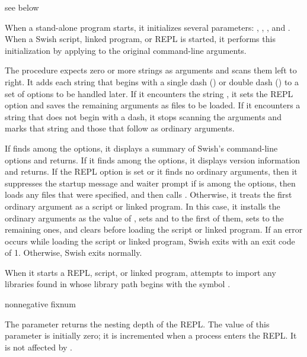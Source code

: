 \begin{procedure}
\end{procedure}
\returns{} see below

When a stand-alone program starts, it initializes several parameters:
, , , and
.
When a Swish script, linked program, or REPL is started, it performs this
initialization by applying  to the original command-line
arguments.

The  procedure expects zero or more strings as arguments
and scans them left to right.
It adds each string that begins with a single dash (\sopt{}) or double dash
(\lopt{}) to a set of options to be handled later.
If it encounters the string \str{\lopt{}}, it sets the REPL option and
saves the remaining arguments as files to be loaded.
If it encounters a string that does not begin with a dash, it stops scanning
the arguments and marks that string and those that follow as ordinary
arguments.

If  finds  among the options,
it displays a summary of Swish's command-line options and returns.
If it finds  among the options,
it displays version information and returns.
If the REPL option is set or it finds no ordinary arguments, then it
suppresses the startup message and waiter prompt 
if  is among the options,
then loads any files that were specified,
and then calls . 
Otherwise, it treats the first ordinary argument as a script or linked program.
In this case, it installs the ordinary arguments as
the value of ,
sets  and  to the first of them,
sets  to the remaining ones,
and clears 
before loading the script or linked program.
If an error occurs while loading the script or linked program,
Swish exits with an exit code of 1.
Otherwise, Swish exits normally.

When it starts a REPL, script, or linked program,  attempts
to import any libraries found in  whose library path begins
with the symbol .

\begin{parameter}
\end{parameter}
\hasvalue{} nonnegative fixnum

The  parameter returns the nesting depth of the
 REPL.
The value of this parameter is initially zero; it is incremented when a
process enters the  REPL.
It is not affected by .


